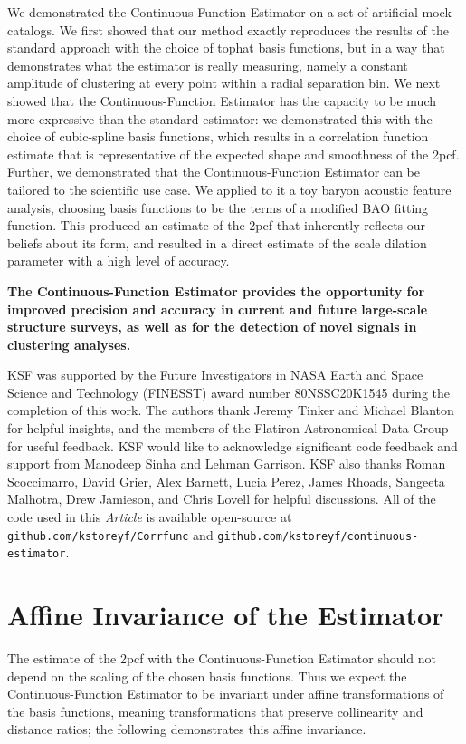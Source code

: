 \documentclass[modern]{aastex62}
\newcommand{\cf}{2pcf\xspace}
\newcommand{\Est}{The Continuous-Function Estimator\xspace}
\newcommand{\est}{the Continuous-Function Estimator\xspace}
\newcommand{\documentname}{\textsl{Article}\xspace}
\newcommand{\new}[1]{\textbf{#1}}
\begin{document}
We demonstrated \est on a set of artificial mock catalogs.
We first showed that our method exactly reproduces the results of the standard approach with the choice of tophat basis functions, but in a way that demonstrates what the estimator is really measuring, namely a constant amplitude of clustering at every point within a radial separation bin.
We next showed that \est has the capacity to be much more expressive than the standard estimator: we demonstrated this with the choice of cubic-spline basis functions, which results in a correlation function estimate that is representative of the expected shape and smoothness of the \cf.
Further, we demonstrated that \est can be tailored to the scientific use case.
We applied to it a toy baryon acoustic feature analysis, choosing basis functions to be the terms of a modified BAO fitting function.
This produced an estimate of the \cf that inherently reflects our beliefs about its form, and resulted in a direct estimate of the scale dilation parameter with a high level of accuracy.

\new{\Est provides the opportunity for improved precision and accuracy in current and future large-scale structure surveys, as well as for the detection of novel signals in clustering analyses.}


\acknowledgements
KSF was supported by the Future Investigators in NASA Earth and Space Science and Technology (FINESST) award number 80NSSC20K1545 during the completion of this work.
The authors thank Jeremy Tinker and Michael Blanton for helpful insights, and the members of the Flatiron Astronomical Data Group for useful feedback.
KSF would like to acknowledge significant code feedback and support from Manodeep Sinha and Lehman Garrison.
KSF also thanks Roman Scoccimarro, David Grier, Alex Barnett, Lucia Perez, James Rhoads, Sangeeta Malhotra, Drew Jamieson, and Chris Lovell for helpful discussions.
All of the code used in this \documentname is available open-source at \texttt{github.com/kstoreyf/Corrfunc} and \texttt{github.com/kstoreyf/continuous-estimator}. 


\appendix

\section{Affine Invariance of the Estimator}\label{sec:affine}

The estimate of the \cf with \est should not depend on the scaling of the chosen basis functions.
Thus we expect \est to be invariant under affine transformations of the basis functions, meaning transformations that preserve collinearity and distance ratios; the following demonstrates this affine invariance.
\end{document}
